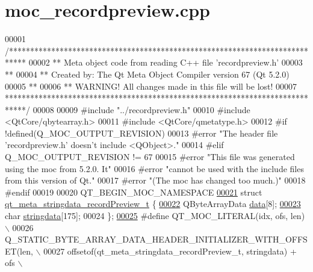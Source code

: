 \hypertarget{a00017_source}{\section{moc\+\_\+recordpreview.\+cpp}
\label{a00017_source}
}

\begin{DoxyCode}
00001 \textcolor{comment}{/****************************************************************************}
00002 \textcolor{comment}{** Meta object code from reading C++ file 'recordpreview.h'}
00003 \textcolor{comment}{**}
00004 \textcolor{comment}{** Created by: The Qt Meta Object Compiler version 67 (Qt 5.2.0)}
00005 \textcolor{comment}{**}
00006 \textcolor{comment}{** WARNING! All changes made in this file will be lost!}
00007 \textcolor{comment}{*****************************************************************************/}
00008 
00009 \textcolor{preprocessor}{#include "../recordpreview.h"}
00010 \textcolor{preprocessor}{#include <QtCore/qbytearray.h>}
00011 \textcolor{preprocessor}{#include <QtCore/qmetatype.h>}
00012 \textcolor{preprocessor}{#if !defined(Q\_MOC\_OUTPUT\_REVISION)}
00013 \textcolor{preprocessor}{#error "The header file 'recordpreview.h' doesn't include <QObject>."}
00014 \textcolor{preprocessor}{#elif Q\_MOC\_OUTPUT\_REVISION != 67}
00015 \textcolor{preprocessor}{#error "This file was generated using the moc from 5.2.0. It"}
00016 \textcolor{preprocessor}{#error "cannot be used with the include files from this version of Qt."}
00017 \textcolor{preprocessor}{#error "(The moc has changed too much.)"}
00018 \textcolor{preprocessor}{#endif}
00019 
00020 QT\_BEGIN\_MOC\_NAMESPACE
\hypertarget{a00017_source_l00021}{}\hyperlink{a00017}{00021} \textcolor{keyword}{struct }\hyperlink{a00017_df/d6a/a00119}{qt\_meta\_stringdata\_recordPreview\_t} \{
\hypertarget{a00017_source_l00022}{}\hyperlink{a00017_a61be725f4f67b385a56830793423ff45}{00022}     QByteArrayData \hyperlink{a00017_a61be725f4f67b385a56830793423ff45}{data}[8];
\hypertarget{a00017_source_l00023}{}\hyperlink{a00017_af0762b30c491f46fa9caf80c9ae5f6ca}{00023}     \textcolor{keywordtype}{char} \hyperlink{a00017_af0762b30c491f46fa9caf80c9ae5f6ca}{stringdata}[175];
00024 \};
\hypertarget{a00017_source_l00025}{}\hyperlink{a00017_a75bb9482d242cde0a06c9dbdc6b83abe}{00025} \textcolor{preprocessor}{#define QT\_MOC\_LITERAL(idx, ofs, len) \(\backslash\)}
00026 \textcolor{preprocessor}{    Q\_STATIC\_BYTE\_ARRAY\_DATA\_HEADER\_INITIALIZER\_WITH\_OFFSET(len, \(\backslash\)}
00027 \textcolor{preprocessor}{    offsetof(qt\_meta\_stringdata\_recordPreview\_t, stringdata) + ofs \(\backslash\)}

\end{DoxyCode}
